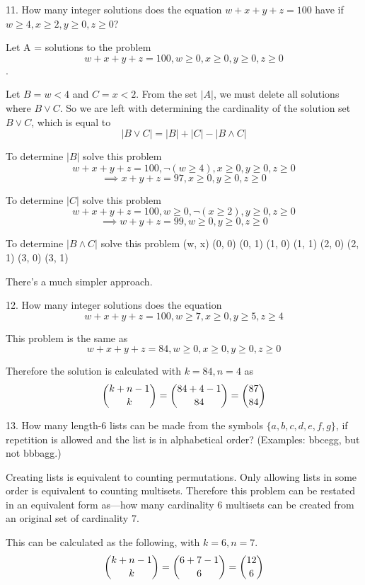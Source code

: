 \documentclass{hippoidC}
\begin{document}
\begin{prooflist}{11. How many integer solutions does the equation
		$w + x + y+ z = 100$ have if $w \geq 4, x \geq 2, y \geq 0, z \geq 0$?}
	\item Let A = solutions to the problem
	$$w + x + y+ z = 100, w \geq 0, x \geq 0, y \geq 0, z \geq 0$$.
	\item Let $B=w<4$ and $C=x<2$. From the set $|A|$, we must delete all solutions
	where $B\lor C$. So we are left with determining the cardinality of the
	solution set $B \lor C$, which is equal to
	$$
		|B\lor C| = |B| + |C| - |B\land C|
	$$
	\item To determine $|B|$ solve this problem
	$$w + x + y+ z = 100, \neg(w \geq 4), x \geq 0, y \geq 0, z \geq 0$$
	$$\implies x + y+ z = 97, x \geq 0, y \geq 0, z \geq 0$$

	\item To determine $|C|$ solve this problem
	$$w + x + y+ z = 100, w \geq 0, \neg(x \geq 2), y \geq 0, z \geq 0$$
	$$\implies w + y+ z = 99, w \geq 0, y \geq 0, z \geq 0$$

	\item To determine $|B\land C|$ solve this problem
	(w, x)
	(0, 0)
	(0, 1)
	(1, 0)
	(1, 1)
	(2, 0)
	(2, 1)
	(3, 0)
	(3, 1)
	\item There's a much simpler approach.
\end{prooflist}

\begin{prooflist}{12. How many integer solutions does the equation
		$$w + x + y+ z = 100, w \geq 7, x \geq 0, y \geq 5, z \geq 4$$
	}
	\item This problem is the same as
	$$w + x + y+ z = 84, w \geq 0, x \geq 0, y \geq 0, z \geq 0$$
	\item Therefore the solution is calculated with $k=84, n=4$ as
	$$ \dbinom{k+n-1}{k} = \dbinom{84+4-1}{84}=\dbinom{87}{84}$$
\end{prooflist}

\begin{prooflist}{13. How many length-6 lists can be made from the symbols $\{a,
			b, c, d, e, f, g\}$, if repetition is allowed and the list is in
		alphabetical order? (Examples: bbcegg, but not bbbagg.)}
	\item Creating lists is equivalent to counting permutations. Only allowing lists
	in some order is equivalent to counting multisets. Therefore this problem
	can be restated in an equivalent form as---how many cardinality 6 multisets
	can be created from an original set of cardinality 7.
	\item This can be calculated as the following, with $k=6, n=7$.
	$$ \dbinom{k+n-1}{k} = \dbinom{6+7-1}{6}=\dbinom{12}{6}$$
\end{prooflist}
\end{document}
